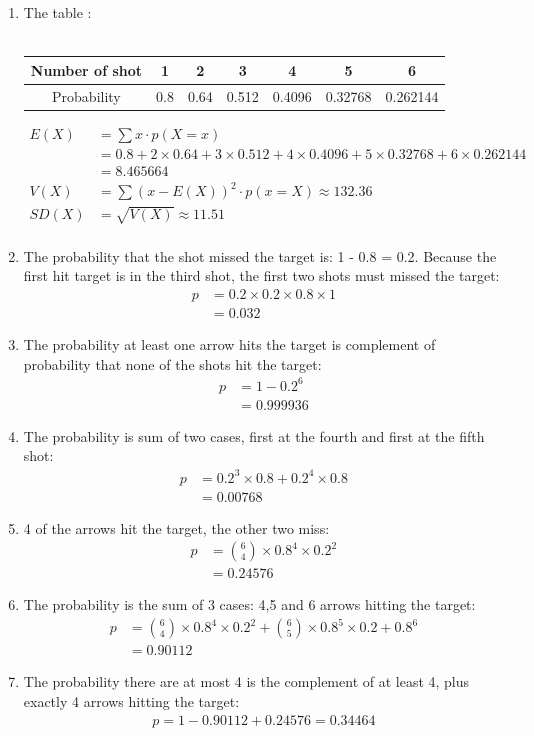 \documentclass[a4paper]{article}
\begin{document}
	\begin{enumerate}
		\item The table : \\ \\
		\begin{tabular}{|c|c|c|c|c|c|c|}
			\hline
			Number of shot & 1 & 2 & 3 & 4 & 5 & 6 \\
			\hline
			Probability & 0.8 & 0.64 & 0.512 & 0.4096 & 0.32768 & 0.262144\\
			\hline
		\end{tabular}
		\begin{align*}
		E(X) &= \sum x\cdot p(X = x) \\
		&= 0.8 + 2\times 0.64 + 3\times 0.512 + 4\times 0.4096 + 5\times 0.32768 + 6 \times 0.262144 \\
		&= 8.465664 \\
		V(X) &= \sum (x - E(X))^{2}\cdot p (x = X) \approx 132.36 \\
		SD(X) &= \sqrt{V(X)} \approx 11.51 \\
		\end{align*}
		\item 
		The probability that the shot missed the target is: 1 - 0.8 = 0.2.
		Because the first hit target is in the third shot, the first two shots must missed the target:
		\begin{align*}
		p &= 0.2\times 0.2 \times 0.8 \times 1 \\ 
		&=0.032
		\end{align*}
		\item
		The probability at least one arrow hits the target is complement of probability that none of the shots hit the target:
		\begin{align*}
		p &= 1 - 0.2^6 \\
		&= 0.999936
		\end{align*}
		\item 
		The probability is sum of two cases, first at the fourth and first at the fifth shot:
		\begin{align*}
		p &= 0.2^3 \times 0.8 + 0.2^4 \times 0.8\\
		&= 0.00768
		\end{align*}
		\item 
		4 of the arrows hit the target, the other two miss:
		\begin{align*}
		p &= {6 \choose 4} \times 0.8^4 \times 0.2^2 \\
		&= 0.24576 
		\end{align*}
		\item 
		The probability is the sum of 3 cases: 4,5 and 6 arrows hitting the target:
		\begin{align*}
		p &= {6 \choose 4} \times 0.8^4 \times 0.2^2 + {6 \choose 5} \times 0.8^5 \times 0.2 + 0.8^6 \\
		&= 0.90112
		\end{align*}
		\item 
		The probability there are at most 4 is the complement of at least 4, plus exactly 4 arrows hitting the target:
		\begin{align*}
		p = 1 - 0.90112 + 0.24576 = 0.34464
		\end{align*}
	\end{enumerate}
\end{document}
